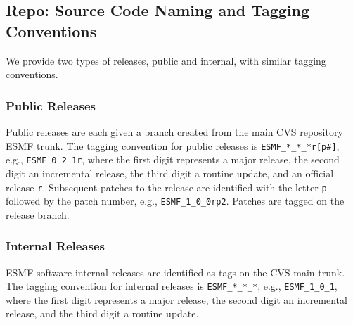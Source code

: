 
\subsection{Repo: Source Code Naming and Tagging Conventions}
\label{sec:tagging}

We provide two types of releases, public and internal, with similar tagging conventions.

\subsubsection{Public Releases}
Public releases are each given a branch created from the main CVS repository ESMF trunk. The tagging convention
for public releases is
{\tt ESMF\_*\_*\_*r[p\#]}, e.g., {\tt ESMF\_0\_2\_1r}, where the first digit represents a major release, the
second digit an incremental release, the third digit a routine update, and an official release {\tt r}.
Subsequent patches to the release are identified with the letter {\tt p} followed by the patch number,
e.g., {\tt ESMF\_1\_0\_0rp2}. Patches are tagged on the release branch.

\subsubsection{Internal Releases}
ESMF software internal releases are identified as tags on the CVS main trunk.
The tagging convention for internal releases is
{\tt ESMF\_*\_*\_*}, e.g., {\tt ESMF\_1\_0\_1}, where the first digit represents a
major release, the second digit an incremental release, and the third digit a routine update.

